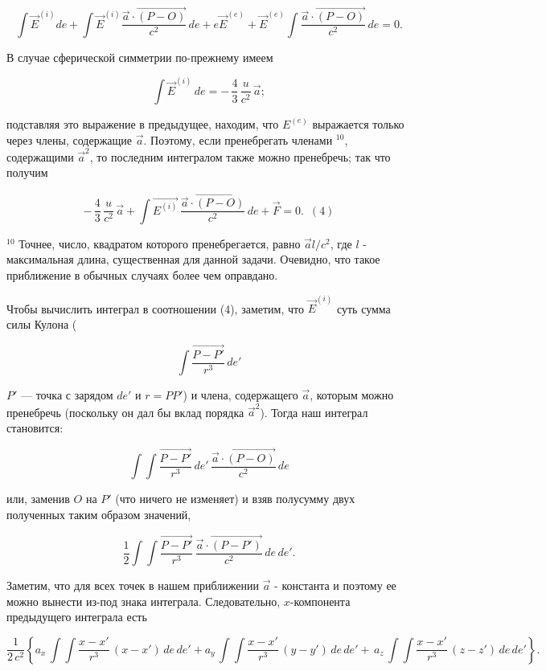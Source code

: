 \documentclass[11pt]{article}
\begin{document}
\[
\int \vec E^{(i)} de +
\int \vec E^{(i)} \frac{\vec {a} \cdot \overrightarrow{\left(P - O\right)}}{c^2} \, de +
e \vec E^{(e)} +
\vec E^{(e)} \int \frac{\vec {a} \cdot \overrightarrow{\left(P - O\right)}}{c^2} \, de
= 0.\]

    В случае сферической симметрии по-прежнему имеем

\[\int \vec {E}^{(i)} \, de = - \, \frac{4}{3} \, \frac{u}{c^2} \, \vec {a};\]

подставляя это выражение в предыдущее, находим, что \(E^{(e)}\) выражается
только через члены, содержащие \(\vec {a}\). Поэтому, если пренебрегать
членами \(^{10}\), содержащими \({\vec {a}}^2\), то последним интегралом
также можно пренебречь; так что получим

\[- \,\frac{4}{3} \,\frac{u}{c^2} \,\vec {a} +
\int \vec {E^{(i)}} \, \frac{\vec {a} \cdot \overrightarrow{\left(P - O\right)}}{c^2} \, de +
\vec {F} = 0. \,\,\, (4)\]

    \(^{10}\) Точнее, число, квадратом которого пренебрегается, равно
\(\vec {a} l/c^2\), где \(l\) - максимальная длина, существенная для
данной задачи. Очевидно, что такое приближение в обычных случаях более
чем оправдано.

    Чтобы вычислить интеграл в соотношении (4), заметим, что ${\vec {E}}^{(i)}$ суть сумма силы Кулона (

\[\int\frac{\overrightarrow{P-P'}}{r^3}\,de'\]

\(P'\) --- точка с зарядом \(de'\) и \(r = PP'\)) и члена, содержащего
\(\vec {a}\), которым можно пренебречь (поскольку он дал бы вклад порядка
\({\vec {a}}^2\)). Тогда наш интеграл становится:

\[\int \int\frac{\overrightarrow{P-P'}}{r^3}\,de' \, \frac{\vec {a} \cdot \overrightarrow{\left(P - O\right)}}{c^2} \, de\]

    или, заменив \(O\) на \(P'\) (что ничего не изменяет) и взяв полусумму
двух полученных таким образом значений,

\[\frac{1}{2} \int \int\frac{\overrightarrow{P-P'}}{r^3} \, \frac{\vec {a} \cdot \overrightarrow{\left(P - P'\right)}}{c^2} \, de\,de'.\]

    Заметим, что для всех точек в нашем приближении \(\vec {a}\) - константа и
поэтому ее можно вынести из-под знака интеграла. Следовательно,
\(x\)-компонента предыдущего интеграла есть

\[\frac{1}{2 \, c^2} \left\{
a_x \, \int \int\frac{{x-x'}}{r^3} \, { {\left(x - x'\right)}} \, de\,de'
+
a_y \, \int \int\frac{{x-x'}}{r^3} \, { {\left(y - y'\right)}} \, de\,de'
+
\, a_z \, \int \int\frac{{x-x'}}{r^3} \, { {\left(z - z'\right)}} \, de\,de'
\right\}.\]
\end{document}
